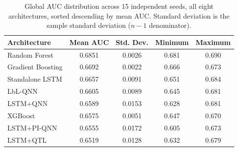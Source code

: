 \begin{table}[htbp]
\centering
\caption{Global AUC distribution across 15 independent seeds, all eight architectures, sorted descending by mean AUC. Standard deviation is the sample standard deviation ($n-1$ denominator).}
\label{tab:multiseed_all}
\begin{tabular}{lcccc}
\toprule
\textbf{Architecture} & \textbf{Mean AUC} & \textbf{Std. Dev.} & \textbf{Minimum} & \textbf{Maximum} \\
\midrule
Random Forest & 0.6851 & 0.0026 & 0.681 & 0.690 \\
Gradient Boosting & 0.6692 & 0.0022 & 0.666 & 0.673 \\
Standalone LSTM & 0.6657 & 0.0091 & 0.651 & 0.684 \\
LbL-QNN & 0.6605 & 0.0089 & 0.645 & 0.681 \\
LSTM+QNN & 0.6589 & 0.0153 & 0.628 & 0.681 \\
XGBoost & 0.6575 & 0.0051 & 0.647 & 0.670 \\
LSTM+PI-QNN & 0.6555 & 0.0172 & 0.605 & 0.673 \\
LSTM+QTL & 0.6519 & 0.0128 & 0.632 & 0.679 \\
\bottomrule
\end{tabular}
\end{table}
